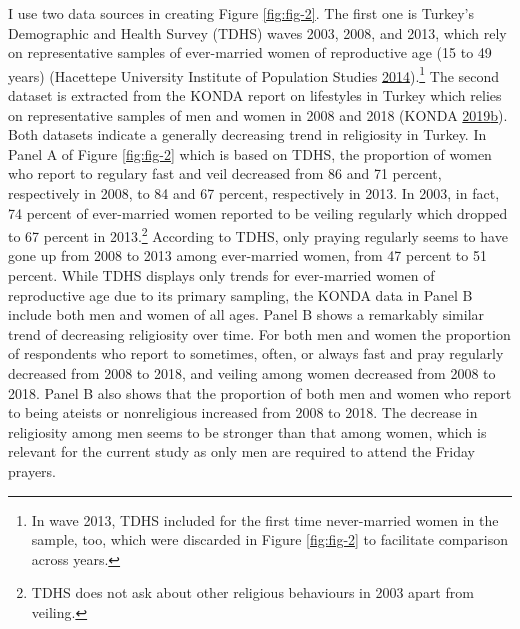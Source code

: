 \documentclass[
  12pt,
]{article}
\begin{document}
I use two data sources in creating Figure \ref{fig:fig-2}. The first one is Turkey's Demographic and Health Survey (TDHS) waves 2003, 2008, and 2013, which rely on representative samples of ever-married women of reproductive age (15 to 49 years) (Hacettepe University Institute of Population Studies \protect\hyperlink{ref-Hac14}{2014}).\footnote{In wave 2013, TDHS included for the first time never-married women in the sample, too, which were discarded in Figure \ref{fig:fig-2} to facilitate comparison across years.} The second dataset is extracted from the KONDA report on lifestyles in Turkey which relies on representative samples of men and women in 2008 and 2018 (KONDA \protect\hyperlink{ref-Kon19rap}{2019}\protect\hyperlink{ref-Kon19rap}{b}). Both datasets indicate a generally decreasing trend in religiosity in Turkey. In Panel A of Figure \ref{fig:fig-2} which is based on TDHS, the proportion of women who report to regulary fast and veil decreased from 86 and 71 percent, respectively in 2008, to 84 and 67 percent, respectively in 2013. In 2003, in fact, 74 percent of ever-married women reported to be veiling regularly which dropped to 67 percent in 2013.\footnote{TDHS does not ask about other religious behaviours in 2003 apart from veiling.} According to TDHS, only praying regularly seems to have gone up from 2008 to 2013 among ever-married women, from 47 percent to 51 percent. While TDHS displays only trends for ever-married women of reproductive age due to its primary sampling, the KONDA data in Panel B include both men and women of all ages. Panel B shows a remarkably similar trend of decreasing religiosity over time. For both men and women the proportion of respondents who report to sometimes, often, or always fast and pray regularly decreased from 2008 to 2018, and veiling among women decreased from 2008 to 2018. Panel B also shows that the proportion of both men and women who report to being ateists or nonreligious increased from 2008 to 2018. The decrease in religiosity among men seems to be stronger than that among women, which is relevant for the current study as only men are required to attend the Friday prayers.
\end{document}
